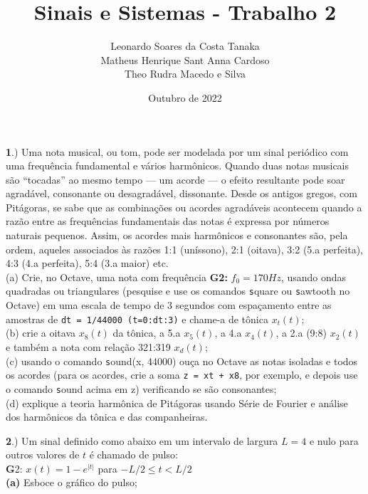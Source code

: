 \documentclass[10pt, a4paper]{article}
\title{Sinais e Sistemas - Trabalho 2}
\author{
    Leonardo Soares da Costa Tanaka\\
    Matheus Henrique Sant Anna Cardoso \\
    Theo Rudra Macedo e Silva
}
\date{Outubro de 2022}
\begin{document}
\maketitle

{\textbf 1.)} Uma nota musical, ou tom, pode ser modelada por um sinal periódico com uma frequência fundamental e vários harmônicos. Quando duas notas musicais são “tocadas” ao mesmo tempo — um acorde — o efeito resultante pode soar agradável, consonante ou desagradável, dissonante. Desde os antigos gregos, com Pitágoras, se sabe que as combinações ou acordes agradáveis acontecem quando a razão entre as frequências fundamentais das notas é expressa por números naturais pequenos. Assim, os acordes mais harmônicos e consonantes são, pela ordem, aqueles associados às razões 1:1 (uníssono), 2:1 (oitava), 3:2 (5.a perfeita), 4:3 (4.a perfeita), 5:4 (3.a maior) etc.\\
(a) Crie, no Octave, uma nota com frequência \textbf{G2:} $f_{0} = 170Hz$, usando ondas quadradas ou triangulares (pesquise e use os comandos {\texttt square} ou {\texttt sawtooth} no Octave) em uma escala de tempo de 3 segundos com espaçamento entre as amostras de {\texttt{dt = 1/44000 (t=0:dt:3)}} e chame-a de tônica $x_{t}(t)$;\\
(b) crie a oitava $x_{8}(t)$ da tônica, a 5.a $x_{5}(t)$, a 4.a $x_{4}(t)$, a 2.a (9:8) $x_{2}(t)$ e também a nota com relação 321:319 $x_{d}(t)$;\\
(c) usando o comando {\texttt sound(x, 44000)} ouça no Octave as notas isoladas e todos os acordes (para os acordes, crie a soma {\texttt{z = xt + x8}}, por exemplo, e depois use o comando {\texttt sound} acima em z) verificando se são consonantes;\\
(d) explique a teoria harmônica de Pitágoras usando Série de Fourier e análise dos harmônicos da tônica e das companheiras.

\vspace{\baselineskip}
{\textbf 2.)} Um sinal definido como abaixo em um intervalo de largura $L = 4$ e nulo para outros valores de $t$ é chamado de pulso:\\
{\textbf G2:} $x(t) = 1 - e^{|t|}$ para $- L/2 \leq t < L/2$\\
{\textbf{(a)}} Esboce o gráfico do pulso;
\end{document}
